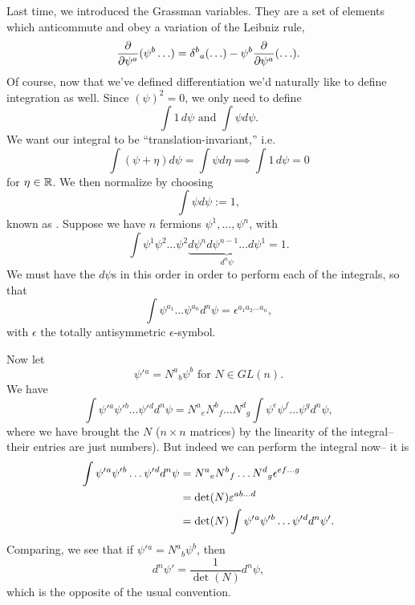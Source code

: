 Last time, we introduced the Grassman variables. They are a set of elements which anticommute and obey a variation of the Leibniz rule,
\begin{equation*}
    \P{}{\psi^a}(\psi^b \ldots)=\delta^b{}_a (\ldots)-\psi^b \P{}{\psi^a}(\ldots).
\end{equation*}
Of course, now that we've defined differentiation we'd naturally like to define integration as well. Since $(\psi)^2=0$, we only need to define
\begin{equation*}
    \int 1\,d\psi\text{ and } \int \psi d\psi.
\end{equation*}
We want our integral to be ``translation-invariant,'' i.e.
\begin{equation}
    \int (\psi+\eta)d\psi = \int \psi d\eta \implies \int 1 \, d\psi = 0
\end{equation}
for $\eta \in \RR$. We then normalize by choosing
\begin{equation}
    \int \psi d\psi := 1,
\end{equation}
known as . Suppose we have $n$ fermions $\psi^1, \ldots, \psi^n$, with
\begin{equation}
    \int \psi^1 \psi^2 \ldots \psi^2 \underbrace{d\psi^n d\psi^{n-1}\ldots d \psi^1}_{d^n \psi}=1.
\end{equation}
We must have the $d\psi$s in this order in order to perform each of the integrals, so that
\begin{equation}
    \int \psi^{a_1}\ldots \psi^{a_n}d^n\psi= \epsilon^{a_1a_2\ldots a_n},
\end{equation}
with $\epsilon$ the totally antisymmetric $\epsilon$-symbol.

Now let
\begin{equation}
    \psi'{}^{a}=N^a{}_b \psi^b \text{ for }N\in GL(n).
\end{equation}
We have
\begin{equation}
    \int \psi'{}^a \psi'{}^b \ldots \psi'{}^d d^n \psi = N^a{}_e N^b{}_f \ldots N^d{}_g \int \psi^e \psi^f \ldots \psi^g d^n \psi,
\end{equation}
where we have brought the $N$ ($n\times n$ matrices) by the linearity of the integral-- their entries are just numbers). But indeed we can perform the integral now-- it is
\begin{align*}
    \int \psi'{}^a \psi'{}^b \ldots \psi'{}^d d^n \psi &= N^a{}_e N^b{}_f \ldots N^d{}_g \epsilon^{ef\ldots g}\\
        &= \det(N) \e^{ab\ldots d}\\
        &= \det(N) \int \psi'{}^a \psi'{}^b \ldots \psi'{}^d d^n \psi'.
\end{align*}
Comparing, we see that if $\psi'{}^a=N^a{}_b \psi^b$, then
\begin{equation}
    d^n \psi' = \frac{1}{\det(N)}d^n \psi,
\end{equation}
which is the opposite of the usual convention.

